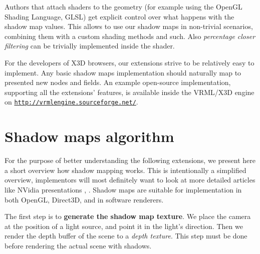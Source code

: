 \documentclass{acmsiggraph}                     %
\newcommand*{\myhref}[2]{\texttt{\href{#1}{\nolinkurl{#2}}}}
\begin{document}
Authors that attach shaders to the geometry (for example using
the OpenGL Shading Language, GLSL) get explicit control over
what happens with the shadow map values. This allows to use our shadow maps
in non-trivial scenarios, combining them with a custom shading methods and such.
Also \emph{percentage closer filtering} \cite{gpugems:pcf}
can be trivially implemented inside the shader.

For the developers of X3D browsers, our extensions strive to be relatively easy to implement.
Any basic shadow maps implementation should naturally map to presented new nodes
and fields. An example open-source implementation, supporting all
the extensions' features, is available inside the VRML/X3D engine
on \myhref{http://vrmlengine.sourceforge.net/}{http://vrmlengine.sourceforge.net/}.

\section{Shadow maps algorithm}
\label{sec_algorithm}

For the purpose of better understanding the following extensions,
we present here a short overview how shadow mapping works.
This is intentionally a simplified overview, implementors will most
definitely want to look at more detailed articles like
NVidia presentations \cite{nvidia:sm}, \cite{nvidia:hsm}. Shadow maps are
suitable for implementation in both OpenGL, Direct3D, and in software renderers.


\needspace{1in}
The first step is to \textbf{generate the shadow map texture}.
We place the camera at the position of a light source, and point it in the
light's direction. Then we render the depth buffer of the scene to
a \emph{depth texture}. This step must be done before rendering the actual
scene with shadows.
\end{document}
